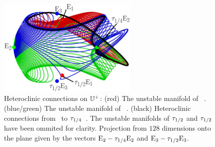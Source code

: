 \begin{figure}[t]
\begin{center}
        \includegraphics[width=0.6\textwidth, clip=true]{figs/KS22hetero.eps}
\end{center}
\caption{ Heteroclinic connections on $\mathbb{U}^+$:
 (red) The unstable manifold of ~\eqv.
 (blue/green) The unstable manifold of ~\eqv.
 (black) Heteroclinic connections from ~\eqv to $\tau_{1/4}$~\eqv.
 The unstable manifolds of $\tau_{1/2}$ and $\tau_{1/2}$ have been ommited
 for clarity. Projection from $128$ dimensions onto the plane given by the vectors
 $\mathrm{E}_{2}-\tau_{1/4}\mathrm{E}_{2}$ and $\mathrm{E}_{3}-\tau_{1/2}\mathrm{E}_{3}$.}
\label{f:KS22hetero}
\end{figure}


